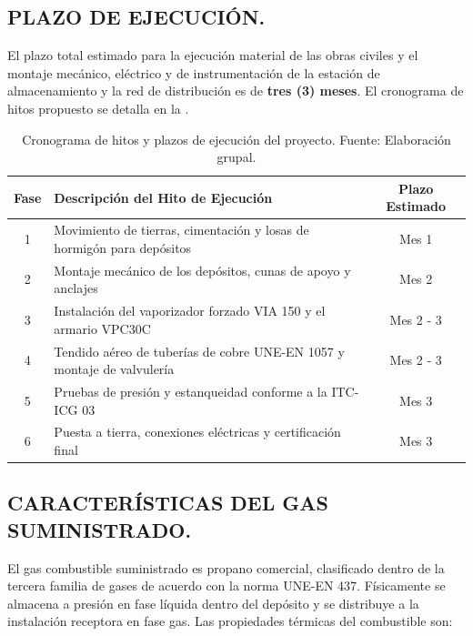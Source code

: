 \documentclass[12pt]{article}
\begin{document}
        \subsection{PLAZO DE EJECUCIÓN.}
        El plazo total estimado para la ejecución material de las obras civiles y el montaje mecánico, eléctrico y de instrumentación de la estación de almacenamiento y la red de distribución es de \textbf{tres (3) meses}. El cronograma de hitos propuesto se detalla en la .
        
        \begin{table}[H]
            \centering
            \caption{Cronograma de hitos y plazos de ejecución del proyecto. Fuente: Elaboración grupal.}
            \label{tab:cronograma}
            \begin{tabularx}{\textwidth}{c X c}
                \toprule
                \textbf{Fase} & \textbf{Descripción del Hito de Ejecución} & \textbf{Plazo Estimado} \\
                \midrule
                1 & Movimiento de tierras, cimentación y losas de hormigón para depósitos & Mes 1 \\
                2 & Montaje mecánico de los depósitos, cunas de apoyo y anclajes & Mes 2 \\
                3 & Instalación del vaporizador forzado VIA 150 y el armario VPC30C & Mes 2 - 3 \\
                4 & Tendido aéreo de tuberías de cobre UNE-EN 1057 y montaje de valvulería & Mes 2 - 3 \\
                5 & Pruebas de presión y estanqueidad conforme a la ITC-ICG 03 & Mes 3 \\
                6 & Puesta a tierra, conexiones eléctricas y certificación final & Mes 3 \\
                \bottomrule
            \end{tabularx}
        \end{table}

        \subsection{CARACTERÍSTICAS DEL GAS SUMINISTRADO.}
        El gas combustible suministrado es propano comercial, clasificado dentro de la tercera familia de gases de acuerdo con la norma UNE-EN 437. Físicamente se almacena a presión en fase líquida dentro del depósito y se distribuye a la instalación receptora en fase gas. Las propiedades térmicas del combustible son:
        
\end{document}

